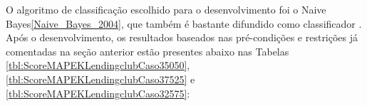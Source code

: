 \documentclass[portugues]{ic-tese}
\begin{document}
O algoritmo de classificação escolhido para o desenvolvimento foi o Naive Bayes\ref{Naive_Bayes_2004}, que também é bastante difundido como classificador
. Após o desenvolvimento, os resultados baseados nas pré-condições e restrições já comentadas na seção anterior estão presentes abaixo nas Tabelas \ref{tbl:ScoreMAPEKLendingclubCaso35050}, \ref{tbl:ScoreMAPEKLendingclubCaso37525} e \ref{tbl:ScoreMAPEKLendingclubCaso32575}:

\begin{table}[H]
\begin{center}
  \caption{Melhores opções escolhidas pelo modelo MAPE-K \\ Todos os métodos - 50\% Performance/50\% Fairness}
\label{tbl:ScoreMAPEKLendingclubCaso35050}
\end{center}
\end{table}
\end{document}
